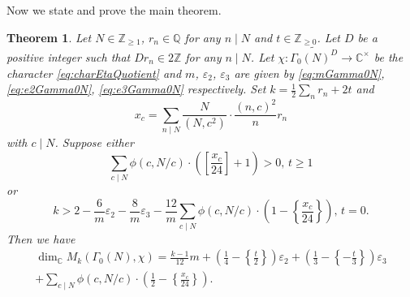 \documentclass[12pt]{amsart}
\numberwithin{equation}{section}
\theoremstyle{plain}
\newtheorem{thm}{Theorem}[section]
\theoremstyle{definition}
\theoremstyle{remark}
\newcommand\numZ{\mathbb{Z}}
\newcommand\numQ{\mathbb{Q}}
\newcommand\numC{\mathbb{C}}
\newcommand\numgeq[2]{\mathbb{#1}_{\geq #2}}
\newcommand\Dcover[2]{\widetilde{#1^{#2}}}
\begin{document}
Now we state and prove the main theorem.
\begin{thm}
\label{thm:main}
Let $N\in\numgeq{Z}{1}$, $r_n\in\numQ$ for any $n \mid N$ and $t\in\numgeq{Z}{0}$. Let $D$ be a positive integer such that $Dr_n\in2\numZ$ for any $n \mid N$. Let $\chi\colon\Dcover{\Gamma_0(N)}{D}\to\numC^\times$ be the character \eqref{eq:charEtaQuotient} and $m$, $\varepsilon_2$, $\varepsilon_3$ are given by \eqref{eq:mGamma0N}, \eqref{eq:e2Gamma0N}, \eqref{eq:e3Gamma0N} respectively. Set $k=\frac{1}{2}\sum_n r_n+2t$ and
\begin{equation}
\label{eq:rntoxc}
x_c=\sum_{n\mid N}\frac{N}{(N,c^2)}\cdot\frac{(n,c)^2}{n}r_n
\end{equation}
with $c\mid N$. Suppose either
\begin{equation}
\label{eq:mainThmCondtion1}
\sum_{c\mid N}\phi(c,N/c)\cdot\left(\left[\frac{x_c}{24}\right]+1\right)>0,\, t \geq 1
\end{equation}
or
\begin{equation}
\label{eq:mainThmCondtion2}
k>2-\frac{6}{m}\varepsilon_2-\frac{8}{m}\varepsilon_3-\frac{12}{m}\sum_{c\mid N}\phi(c,N/c)\cdot\left(1-\left\{\frac{x_c}{24}\right\}\right),\,t=0.
\end{equation}
Then we have
\begin{multline}
\label{eq:dimFormula}
\dim_\numC M_k(\Gamma_0(N), \chi)=\frac{k-1}{12}m+\left(\frac{1}{4}-\left\{\frac{t}{2}\right\}\right)\varepsilon_2+\left(\frac{1}{3}-\left\{-\frac{t}{3}\right\}\right)\varepsilon_3\\
+\sum_{c\mid N}\phi(c,N/c)\cdot\left(\frac{1}{2}-\left\{\frac{x_c}{24}\right\}\right).
\end{multline}
\end{thm}
\end{document}

